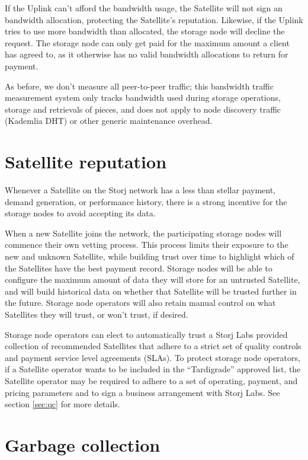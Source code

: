 \documentclass[8pt,fleqn,openany]{book}
\begin{document}
If the Uplink can't afford the bandwidth usage, the Satellite will not sign an
bandwidth allocation, protecting the Satellite's reputation.
Likewise, if the Uplink tries to use more bandwidth than allocated,
the storage node will decline the request.
The storage node can only get paid for the maximum amount a client has agreed to,
as it otherwise has no valid bandwidth allocations to return for payment.

As before, we don't measure all peer-to-peer traffic;
this bandwidth traffic measurement system only tracks
bandwidth used during storage operations, storage and retrievals of pieces,
and does not apply to node discovery traffic (Kademlia DHT) or other generic
maintenance overhead.

\section{Satellite reputation}\label{sec:concrete-satellite-reputation}

Whenever a Satellite on the Storj network has a less than stellar payment,
demand generation, or performance history,
there is a strong incentive for the storage nodes to avoid accepting its data.

When a new Satellite joins the network, the participating storage nodes will
commence their own vetting process.
This process limits their exposure to the new and unknown
Satellite, while building trust over time to highlight which of the
Satellites have the best payment record.
Storage nodes will be able to configure the maximum amount of data they will
store for an untrusted Satellite, and will build historical data on whether
that Satellite will be trusted further in the future.
Storage node operators will also retain manual control on what Satellites they
will trust, or won't trust, if desired.

Storage node operators can elect to automatically trust a Storj Labs
provided collection of recommended Satellites that adhere to a strict set of
quality controls and payment service level agreements (SLAs).
To protect storage node operators, if a Satellite operator wants to be
included in the ``Tardigrade'' approved list,
the Satellite operator may be required to
adhere to a set of operating, payment, and pricing parameters and to sign a
business arrangement with Storj Labs.
See section \ref{sec:qc} for more details.

\section{Garbage collection}\label{sec:garbage-collection}
\end{document}
